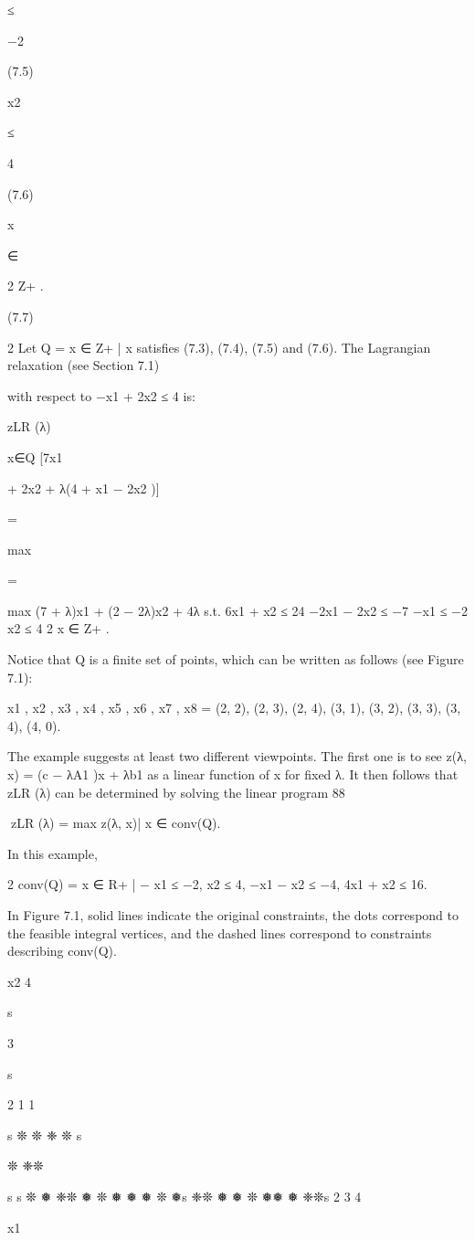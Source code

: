 ≤

−2

(7.5)

x2

≤

4

(7.6)

x

∈

2
Z+
.

(7.7)

2
Let Q = {x ∈ Z+
| x satisfies (7.3), (7.4), (7.5) and (7.6)}. The Lagrangian relaxation (see Section 7.1)

with respect to −x1 + 2x2 ≤ 4 is:

zLR (λ)

x∈Q [7x1

+ 2x2 + λ(4 + x1 − 2x2 )]

=

max

=

max (7 + λ)x1 + (2 − 2λ)x2 + 4λ
s.t. 6x1 + x2 ≤ 24
−2x1 − 2x2 ≤ −7
−x1 ≤ −2
x2 ≤ 4
2
x ∈ Z+
.

Notice that Q is a finite set of points, which can be written as follows (see Figure 7.1):

{x1 , x2 , x3 , x4 , x5 , x6 , x7 , x8 } = {(2, 2), (2, 3), (2, 4), (3, 1), (3, 2), (3, 3), (3, 4), (4, 0)}.

The example suggests at least two different viewpoints. The first one is to see z(λ, x) = (c − λA1 )x + λb1
as a linear function of x for fixed λ. It then follows that zLR (λ) can be determined by solving the linear
program
88

zLR (λ) = max {z(λ, x)| x ∈ conv(Q)}.

In this example,

2
conv(Q) = {x ∈ R+
| − x1 ≤ −2, x2 ≤ 4, −x1 − x2 ≤ −4, 4x1 + x2 ≤ 16}.

In Figure 7.1, solid lines indicate the original constraints, the dots correspond to the feasible integral
vertices, and the dashed lines correspond to constraints describing conv(Q).

x2
4

s

3

s

2
1
1

s ❊
❊
❈ ❊
s

❊
❈❊

s
s ❊
❅
❈❊
❅
❊
❅
❅ ❅
❊
❅s
❈❊
❅
❅ ❊
❅❅
❅ ❈❊s
2
3
4

x1

